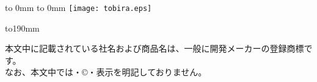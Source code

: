 %
\thispagestyle{empty}
\vbox to 0mm{\vspace*{-27.5truemm}
\hbox to 0mm{
\hspace*{-23.8truemm}\texttt{[image: tobira.eps]}
}\vss}


\pagebreak

%
\thispagestyle{frontheadings}

\vbox to190mm{
\vfil
\begin{minipage}[b]{112mm}
%
\begin{spacing}{1.0}
\begin{small}
本文中に記載されている社名および商品名は、一般に開発メーカーの登録商標です。\\
なお、本文中では\texttrademark ・\copyright ・\textregistered 表示を明記しておりません。
\end{small}
\end{spacing}
\end{minipage}
}

